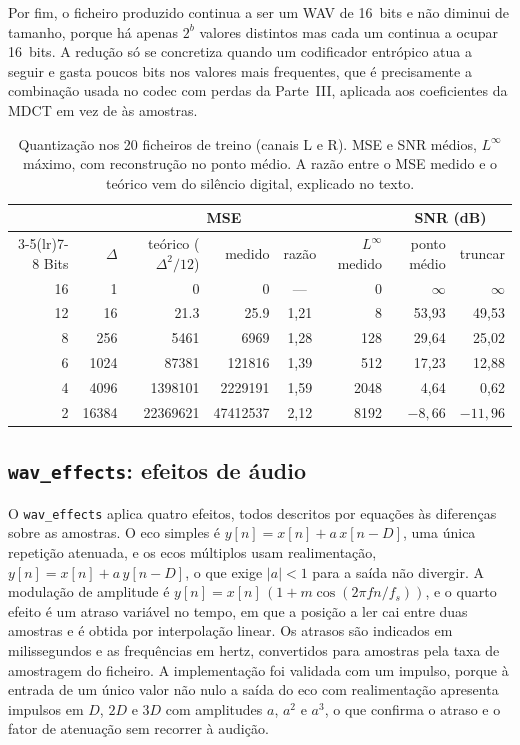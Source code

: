 \documentclass[a4paper,11pt]{article}
\newcommand{\prog}[1]{\texttt{#1}}
\begin{document}
Por fim, o ficheiro produzido continua a ser um WAV de \SI{16}{bits} e não
diminui de tamanho, porque há apenas $2^b$ valores distintos mas cada um
continua a ocupar 16~bits. A redução só se concretiza quando um codificador
entrópico atua a seguir e gasta poucos bits nos valores mais frequentes, que é
precisamente a combinação usada no codec com perdas da Parte~III, aplicada aos
coeficientes da MDCT em vez de às amostras.

\begin{table}[htbp]
\centering
\footnotesize
\setlength{\tabcolsep}{4pt}
\begin{tabular}{rrrrcrrr}
\toprule
 & & \multicolumn{3}{c}{MSE} & & \multicolumn{2}{c}{SNR (dB)} \\
\cmidrule(lr){3-5}\cmidrule(lr){7-8}
Bits & $\Delta$ & teórico ($\Delta^2/12$) & medido & razão & $L^\infty$ medido & ponto médio & truncar \\
\midrule
16 & 1     & 0                & 0                & ---    & 0      & $\infty$ & $\infty$ \\
12 & 16    & \num{21,3}       & \num{25,9}       & 1,21   & 8      & 53,93    & 49,53 \\
8  & 256   & \num{5461}       & \num{6969}       & 1,28   & 128    & 29,64    & 25,02 \\
6  & 1024  & \num{87381}      & \num{121816}     & 1,39   & 512    & 17,23    & 12,88 \\
4  & 4096  & \num{1398101}    & \num{2229191}    & 1,59   & 2048   & 4,64     & 0,62 \\
2  & 16384 & \num{22369621}   & \num{47412537}   & 2,12   & 8192   & $-8{,}66$ & $-11{,}96$ \\
\bottomrule
\end{tabular}
\caption{Quantização nos 20 ficheiros de treino (canais L e R). MSE e SNR
médios, $L^\infty$ máximo, com reconstrução no ponto médio. A razão entre o MSE
medido e o teórico vem do silêncio digital, explicado no texto.}
\label{tab:quant}
\end{table}

\subsection{\prog{wav\_effects}: efeitos de áudio}
\label{sec:effects}
O \prog{wav\_effects} aplica quatro efeitos, todos descritos por equações às
diferenças sobre as amostras. O eco simples é $y[n] = x[n] + a\,x[n-D]$, uma
única repetição atenuada, e os ecos múltiplos usam realimentação,
$y[n] = x[n] + a\,y[n-D]$, o que exige $|a| < 1$ para a saída não divergir. A
modulação de amplitude é $y[n] = x[n]\,(1 + m\cos(2\pi f n / f_s))$, e o quarto
efeito é um atraso variável no tempo, em que a posição a ler cai entre duas
amostras e é obtida por interpolação linear. Os atrasos são indicados em
milissegundos e as frequências em hertz, convertidos para amostras pela taxa de
amostragem do ficheiro. A implementação foi validada com um impulso, porque à
entrada de um único valor não nulo a saída do eco com realimentação apresenta
impulsos em $D$, $2D$ e $3D$ com amplitudes $a$, $a^2$ e $a^3$, o que confirma o
atraso e o fator de atenuação sem recorrer à audição.
\end{document}
